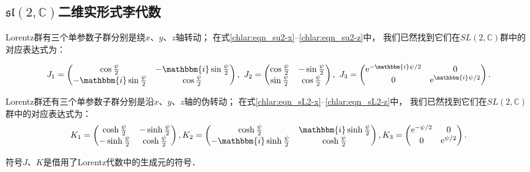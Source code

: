 


\subsection{$\mathfrak{sl}(2,\mathbb{C})$二维实形式李代数}\label{chlar:sec_sl-LA}

Lorentz群有三个单参数子群分别是绕$x$、$y$、$z$轴转动；
在式\eqref{chlar:eqn_su2-x}--\eqref{chlar:eqn_su2-z}中，
我们已然找到它们在$SL(2,\mathbb{C})$群中的对应表达式为：
\begin{small}
\setlength{\mathindent}{0em}
\begin{equation}
    J_1=\begin{pmatrix}
        \cos \frac{\psi}{2} & -\mathbbm{i} \sin \frac{\psi}{2} \\
        -\mathbbm{i} \sin \frac{\psi}{2} & \cos \frac{\psi}{2}
    \end{pmatrix}, \ 
    J_2=\begin{pmatrix}
        \cos \frac{\psi}{2} & -\sin \frac{\psi}{2} \\
        \sin \frac{\psi}{2} & \cos \frac{\psi}{2}
    \end{pmatrix}, \
     J_3=\begin{pmatrix}
        \mathrm{e}^{-\mathbbm{i} \psi / 2} & 0 \\
        0 & \mathrm{e}^{\mathbbm{i} \psi / 2}
   \end{pmatrix}.
\end{equation}   \setlength{\mathindent}{2em}

Lorentz群还有三个单参数子群分别是沿$x$、$y$、$z$轴的伪转动；
在式\eqref{chlar:eqn_sL2-x}--\eqref{chlar:eqn_sL2-z}中，
我们已然找到它们在$SL(2,\mathbb{C})$群中的对应表达式为：
\setlength{\mathindent}{-1em}
\begin{equation}
    K_1=\begin{pmatrix}
        \cosh \frac{\psi}{2} & -\sinh \frac{\psi}{2} \\
        -\sinh \frac{\psi}{2} & \cosh \frac{\psi}{2}
    \end{pmatrix}, 
    K_2=\begin{pmatrix}
        \cosh \frac{\psi}{2} & \mathbbm{i} \sinh \frac{\psi}{2} \\
        -\mathbbm{i} \sinh \frac{\psi}{2} & \cosh \frac{\psi}{2}
    \end{pmatrix},
    K_3=\begin{pmatrix}
        \mathrm{e}^{-\psi / 2} & 0 \\
        0 & \mathrm{e}^{\psi / 2}
\end{pmatrix} .
\end{equation}\setlength{\mathindent}{2em}
\end{small}
符号$J$、$K$是借用了Lorentz代数中的生成元的符号．

